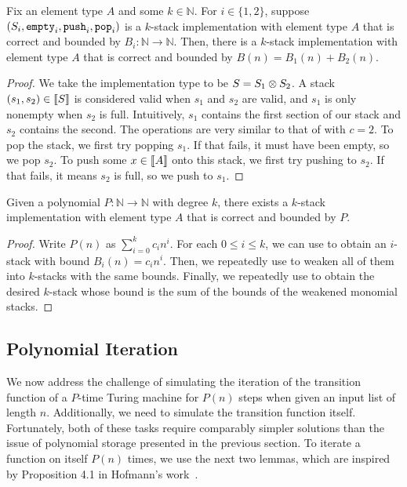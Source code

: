 \begin{lemma}
\label{lem:stack-additive}
Fix an element type $A$ and some $k \in \mathbb N$. For $i \in \{1,2\}$, suppose $(S_i, \mathtt{empty}_i, \mathtt{push}_i, \mathtt{pop}_i)$ is a $k$-stack implementation with element type $A$ that is correct and bounded by $B_i : \mathbb N \to \mathbb N$. Then, there is a $k$-stack implementation with element type $A$ that is correct and bounded by $B(n) = B_1(n) + B_2(n)$. 
\end{lemma}
\begin{proof}
We take the implementation type to be $S = \tptens{S_1}{S_2}$. A stack $(s_1, s_2) \in \llbracket S \rrbracket$ is considered valid when $s_1$ and $s_2$ are valid, and $s_1$ is only nonempty when $s_2$ is full. Intuitively, $s_1$ contains the first section of our stack and $s_2$ contains the second. The operations are very similar to that of  with $c = 2$. To pop the stack, we first try popping $s_1$. If that fails, it must have been empty, so we pop $s_2$. To push some $x \in \llbracket A \rrbracket$ onto this stack, we first try pushing to $s_2$. If that fails, it means $s_2$ is full, so we push to $s_1$.
\end{proof}

\begin{lemma}
\label{lem:stack-polynomial}
Given a polynomial $P : \mathbb N \to \mathbb N$ with degree $k$, there exists a $k$-stack implementation with element type $A$ that is correct and bounded by $P$.
\end{lemma}
\begin{proof}
Write $P(n)$ as $\sum_{i=0}^k c_i n^i$. For each $0 \le i \le k$, we can use  to obtain an $i$-stack with bound $B_i(n) = c_i n^i$. Then, we repeatedly use  to weaken all of them into $k$-stacks with the same bounds. Finally, we repeatedly use  to obtain the desired $k$-stack whose bound is the sum of the bounds of the weakened monomial stacks.
\end{proof}



\subsection{Polynomial Iteration}
\label{sec:completeness-poly-iter}

We now address the challenge of simulating the iteration of the transition function of a $P$-time Turing machine for $P(n)$ steps when given an input list of length $n$. Additionally, we need to simulate the transition function itself. Fortunately, both of these tasks require comparably simpler solutions than the issue of polynomial storage presented in the previous section. To iterate a function on itself $P(n)$ times, we use the next two lemmas, which are inspired by Proposition 4.1 in Hofmann's work~\cite{hofmannLinearTypesNonsizeincreasing1999}.

